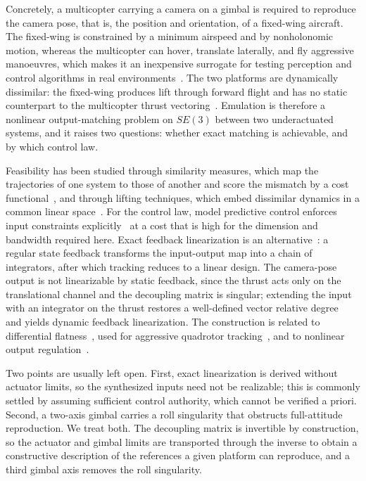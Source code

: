 Concretely, a multicopter carrying a camera on a gimbal is required to reproduce the camera pose, that is, the position and orientation, of a fixed-wing aircraft. The fixed-wing is constrained by a minimum airspeed and by nonholonomic motion, whereas the multicopter can hover, translate laterally, and fly aggressive manoeuvres, which makes it an inexpensive surrogate for testing perception and control algorithms in real environments~\cite{smith2022emulation}. The two platforms are dynamically dissimilar: the fixed-wing produces lift through forward flight and has no static counterpart to the multicopter thrust vectoring~\cite{yuan2025design, wu2019modeling}. Emulation is therefore a nonlinear output-matching problem on $SE(3)$ between two underactuated systems, and it raises two questions: whether exact matching is achievable, and by which control law.

Feasibility has been studied through similarity measures, which map the trajectories of one system to those of another and score the mismatch by a cost functional~\cite{wang2023similarity}, and through lifting techniques, which embed dissimilar dynamics in a common linear space~\cite{xiao2021lifting, quan2025lifting}. For the control law, model predictive control enforces input constraints explicitly~\cite{amer2023visual, amer2025, alexis2016mpc} at a cost that is high for the dimension and bandwidth required here. Exact feedback linearization is an alternative~\cite{isidori1995nonlinear, isidori1981nonlinear}: a regular state feedback transforms the input-output map into a chain of integrators, after which tracking reduces to a linear design. The camera-pose output is not linearizable by static feedback, since the thrust acts only on the translational channel and the decoupling matrix is singular; extending the input with an integrator on the thrust restores a well-defined vector relative degree~\cite{Isidori1986CDC, Mistler2001ROMAN} and yields dynamic feedback linearization. The construction is related to differential flatness~\cite{fliess1995flatness}, used for aggressive quadrotor tracking~\cite{mellinger2011minimum, faessler2018differential, lee2010geometric}, and to nonlinear output regulation~\cite{byrnes1990output}.

Two points are usually left open. First, exact linearization is derived without actuator limits, so the synthesized inputs need not be realizable; this is commonly settled by assuming sufficient control authority, which cannot be verified a priori. Second, a two-axis gimbal carries a roll singularity that obstructs full-attitude reproduction. We treat both. The decoupling matrix is invertible by construction, so the actuator and gimbal limits are transported through the inverse to obtain a constructive description of the references a given platform can reproduce, and a third gimbal axis removes the roll singularity.

